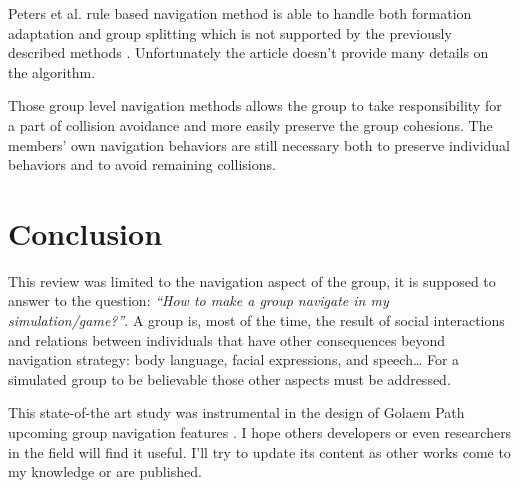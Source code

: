 \documentclass{article}
\begin{document}
Peters et al. rule based navigation method is able to handle both formation adaptation and group splitting which is not supported by the previously described methods \cite{Peters:2009kx}. Unfortunately the article doesn’t provide many details on the algorithm.

Those group level navigation methods allows the group to take responsibility for a part of collision avoidance and more easily preserve the group cohesions. The members’ own navigation behaviors are still necessary both to preserve individual behaviors and to avoid remaining collisions. 

\section{Conclusion}

This review was limited to the navigation aspect of the group, it is supposed to answer to the question: \emph{“How to make a group navigate in my simulation/game?”}. A group is, most of the time, the result of social interactions and relations between individuals that have other consequences beyond navigation strategy: body language, facial expressions, and speech… For a simulated group to be believable those other aspects must be addressed.

This state-of-the art study was instrumental in the design of Golaem Path upcoming group navigation features \cite{GolaemPath:tw}. I hope others developers or even researchers in the field will find it useful. I’ll try to update its content as other works come to my knowledge or are published.




\end{document}
